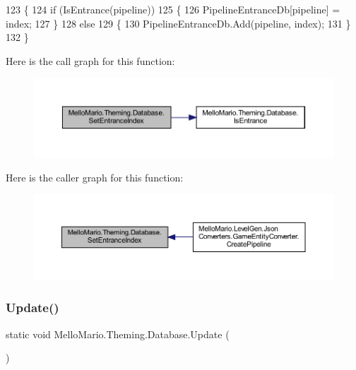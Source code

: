 \begin{DoxyCode}
123         \{
124             \textcolor{keywordflow}{if} (IsEntrance(pipeline))
125             \{
126                 PipelineEntranceDb[pipeline] = index;
127             \}
128             \textcolor{keywordflow}{else}
129             \{
130                 PipelineEntranceDb.Add(pipeline, index);
131             \}
132         \}
\end{DoxyCode}
Here is the call graph for this function\+:
\nopagebreak
\begin{figure}[H]
\begin{center}
\leavevmode
\includegraphics[width=350pt]{classMelloMario_1_1Theming_1_1Database_a05ce5701743a3414d738b840298694ed_cgraph}
\end{center}
\end{figure}
Here is the caller graph for this function\+:
\nopagebreak
\begin{figure}[H]
\begin{center}
\leavevmode
\includegraphics[width=350pt]{classMelloMario_1_1Theming_1_1Database_a05ce5701743a3414d738b840298694ed_icgraph}
\end{center}
\end{figure}
\mbox{\label{classMelloMario_1_1Theming_1_1Database_ab58c2296077881a98bc304b821cd0018}} 
\subsubsection{Update()}
{\footnotesize\ttfamily static void Mello\+Mario.\+Theming.\+Database.\+Update (\begin{DoxyParamCaption}{ }\end{DoxyParamCaption})\hspace{0.3cm}{\ttfamily [static]}}



